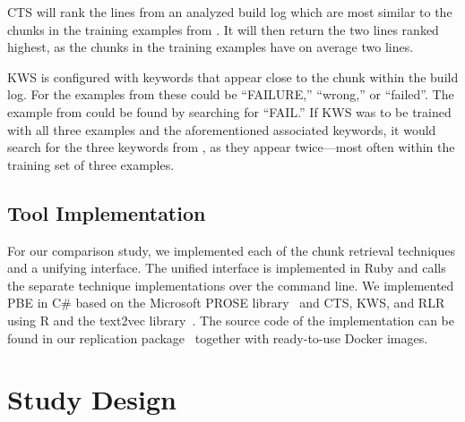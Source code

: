 CTS will rank the lines from an analyzed build log which are most
similar to the chunks in the training examples
from .
It will then return the two lines ranked highest, as the chunks in
the training examples have on average two lines.

KWS is configured with keywords that appear close to the chunk within
the build log.
For the examples from  these could be
``FAILURE,'' ``wrong,'' or ``failed''.
The example from  could be found
by searching for ``FAIL.''
If KWS was to be trained with all three examples and the aforementioned
associated keywords, it would search for the three keywords from
, as they appear twice---most often within
the training set of three examples.

\subsection{Tool Implementation}
For our comparison study, we implemented each of the chunk retrieval
techniques and a unifying interface.
The unified interface is implemented in Ruby and
calls the separate technique implementations over the command line.
We implemented PBE in C\# based on the Microsoft PROSE
library~\cite{prose2019webpage} and CTS, KWS, and RLR using
R and the text2vec library~\cite{text2vec2019webpage}.
The source code of the implementation can be found in our replication
package~\cite{brandt2020chunk-replication} together
with ready-to-use Docker images.

\section{Study Design}



